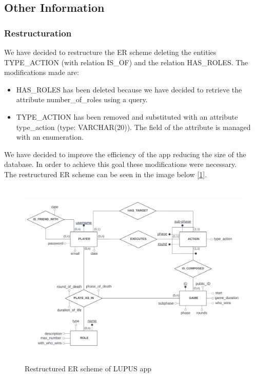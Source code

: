 \subsection{Other Information}


\subsubsection{Restructuration}
We have decided to restructure the ER scheme deleting the entities TYPE\_ACTION (with relation IS\_OF) and the relation HAS\_ROLES. The modifications made are: \\
\begin{itemize}
    \item HAS\_ROLES has been deleted because we have decided to retrieve the attribute number\_of\_roles using a query.\\
    \item TYPE\_ACTION has been removed and substituted with an attribute type\_action (type: VARCHAR(20)). The field of the attribute is managed with an enumeration.
\end{itemize}
We have decided to improve the efficiency of the app reducing the size of the database. In order to achieve this goal these modifications were necessary.\\
The restructured ER scheme can be seen in the image below [\ref{fig:res_er_scheme}].


\begin{figure}[htbp] 
    \centering
    \includegraphics[height=9cm]{images/scheme/er_restructured_f.jpeg}
    \caption{Restructured ER scheme of LUPUS app}
    \label{fig:res_er_scheme}
\end{figure}


